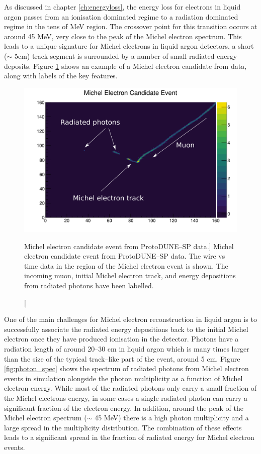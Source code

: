 As discussed in chapter \ref{ch:energyloss}, the energy loss for electrons in
liquid argon passes from an ionisation dominated regime to a radiation dominated
regime in the tens of MeV region. The crossover point for this transition occurs
at around 45 MeV, very close to the peak of the Michel electron spectrum. This
leads to a unique signature for Michel electrons in liquid argon detectors, a
short ($\sim$ 5cm) track segment is surrounded by a number of small radiated 
energy deposits. Figure \ref{fig:michel_event} shows an example of a Michel 
electron candidate from \protodune{} data, along with labels of the key 
features.

\begin{figure}
	\centering
	\includegraphics[width=\textwidth]{figures/michel_candidate_labelled.pdf}
	\caption
	[Michel electron candidate event from ProtoDUNE--SP data.]
	{Michel electron candidate event from ProtoDUNE--SP data. The wire vs time
	data in the region of the Michel electron event is shown.  The incoming muon,
	initial Michel electron track, and energy depositions from radiated photons
	have been labelled.}
	\label{fig:michel_event}
\end{figure}

One of the main challenges for Michel electron reconstruction in liquid argon is
to successfully associate the radiated energy depositions back to the initial
Michel electron once they have produced ionisation in the detector. Photons have
a radiation length of around 20--30 cm in liquid argon which is many times
larger than the size of the typical track--like part of the event, around 5 cm. 
Figure \ref{fig:photon_spec} shows the spectrum of radiated photons from Michel 
electron events in \protodune{} simulation alongside the photon multiplicity 
as a function of Michel electron energy. While most of the radiated photons 
only carry a small fraction of the Michel electrons energy, in some cases a 
single radiated photon can carry a significant fraction of the electron 
energy. In addition, around the peak of the Michel electron spectrum ($\sim$
45 MeV) there is a high photon multiplicity and a large spread in the
multiplicity distribution. The combination of these effects leads to a
significant spread in the fraction of radiated energy for Michel electron
events.

